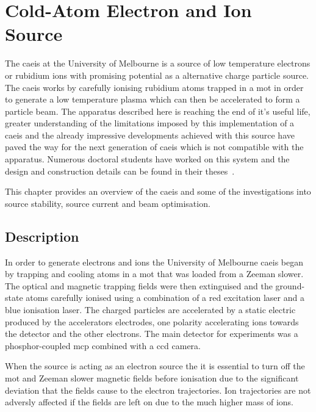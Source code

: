 \chapter{Cold-Atom Electron and Ion Source}\label{chapter:setup}

The \gls{caeis} at the University of Melbourne is a source of low temperature electrons or rubidium ions with promising potential as a alternative charge particle source.
The \gls{caeis} works by carefully ionising rubidium atoms trapped in a \gls{mot} in order to generate a low temperature plasma which can then be accelerated to form a particle beam.
The apparatus described here is reaching the end of it's useful life, greater understanding of the limitations imposed by this implementation of a \gls{caeis} and the already impressive developments achieved with this source have paved the way for the next generation of \gls{caeis} which is not compatible with the apparatus.
Numerous doctoral students have worked on this system and the design and construction details can be found in their theses~\cite{sheludko_shaped_2010,bell_cold_2011,saliba_cold_2011,mcculloch_generation_2013,murphy_measurement_2017,speirs_electron_2017}.

This chapter provides an overview of the \gls{caeis} and some of the investigations into source stability, source current and beam optimisation.

\section{Description}
In order to generate electrons and ions the University of Melbourne \gls{caeis} began by trapping and cooling atoms in a \gls{mot} that was loaded from a Zeeman slower.
The optical and magnetic trapping fields were then extinguised and the ground-state atoms carefully ionised using a combination of a red excitation laser and a blue ionisation laser.
The charged particles are accelerated by a static electric produced by the accelerators electrodes, one polarity accelerating ions towards the detector and the other electrons.
The main detector for experiments was a phosphor-coupled \gls{mcp} combined with a \gls{ccd} camera.

When the source is acting as an electron source the it is essential to turn off the \gls{mot} and Zeeman slower magnetic fields before ionisation due to the significant deviation that the fields cause to the electron trajectories.
Ion trajectories are not adversly affected if the fields are left on due to the much higher mass of ions.

